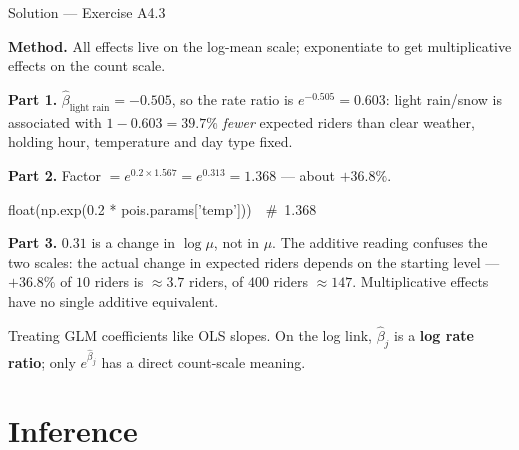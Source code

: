 \documentclass[aspectratio=169,11pt]{beamer}
\begin{document}
\begin{frame}{Solution --- Exercise A4.3}
\begin{solutionbox}
  \textbf{Method.} All effects live on the log-mean scale; exponentiate to get
  multiplicative effects on the count scale.

  \textbf{Part 1.} $\hat\beta_{\text{light rain}} = -0.505$, so the rate ratio is
  $e^{-0.505} = 0.603$: light rain/snow is associated with
  $1-0.603 = \mathbf{39.7\%}$ \emph{fewer} expected riders than clear weather, holding
  hour, temperature and day type fixed.

  \textbf{Part 2.} Factor $= e^{0.2\times 1.567} = e^{0.313} = \mathbf{1.368}$ ---
  about $+36.8\%$.
  \begin{center}\ttfamily float(np.exp(0.2 * pois.params['temp']))\ \ \#\ 1.368\end{center}

  \textbf{Part 3.} $0.31$ is a change in $\log\mu$, not in $\mu$. The additive reading
  confuses the two scales: the actual change in expected riders depends on the starting
  level --- $+36.8\%$ of $10$ riders is $\approx 3.7$ riders, of $400$ riders
  $\approx 147$. Multiplicative effects have no single additive equivalent.
\end{solutionbox}
\begin{mistake}
  Treating GLM coefficients like OLS slopes. On the log link, $\hat\beta_j$ is a
  \textbf{log rate ratio}; only $e^{\hat\beta_j}$ has a direct count-scale meaning.
\end{mistake}
\end{frame}

\section{Inference}
\end{document}
